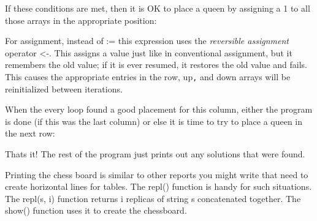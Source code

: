 If these conditions are met, then it is OK to place a queen by assigning
a 1 to all those arrays in the appropriate position:


For assignment, instead of \textsf{:=} this expression
uses the \textit{reversible assignment}
operator \textsf{{\textless}-}. This assigns a value just like in
conventional assignment, but it remembers the old value; if it is ever
resumed, it restores the old value and fails.
This causes the appropriate entries in the \textsf{row},
\textsf{up}\texttt{,} and \textsf{down} arrays will be reinitialized
between iterations.

When the \textsf{every} loop found a good placement for this column,
either the program is done (if this was the last column) or else it is
time to try to place a queen in the next row:


That{\textquotesingle}s it! The rest of the program just prints out any
solutions that were found.

Printing the chess board is similar to other reports you might write
that need to create horizontal lines for tables. The \textsf{repl()}
function is handy for such situations. The \textsf{repl(s, i)} function
returns \textsf{i} {\textquotedbl}replicas{\textquotedbl} of string
\textsf{s} concatenated together. The \textsf{show()} function uses it
to create the chessboard.\textit{ }

